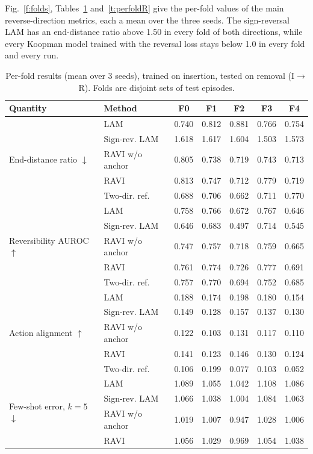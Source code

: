 \documentclass{jcse}
\newcommand{\method}{RAVI}
\begin{document}
Fig.~\ref{f:folds}, Tables~\ref{t:perfoldI} and~\ref{t:perfoldR} give the per-fold values of the main reverse-direction metrics, each a mean over the three seeds.
The sign-reversal LAM has an end-distance ratio above 1.50 in every fold of both directions, while every Koopman model trained with the reversal loss stays below 1.0 in every fold and every run.

\begin{table}
\centering
\caption{Per-fold results (mean over 3 seeds), trained on insertion, tested on removal (I$\to$R). Folds are disjoint sets of test episodes.}
\label{t:perfoldI}
\footnotesize
\setlength{\tabcolsep}{4pt}
\begin{tabular}{llccccc}
\toprule
Quantity & Method & F0 & F1 & F2 & F3 & F4 \\
\midrule
\multirow{5}{*}{End-distance ratio $\downarrow$} & LAM & 0.740 & 0.812 & 0.881 & 0.766 & 0.754 \\
 & Sign-rev. LAM & 1.618 & 1.617 & 1.604 & 1.503 & 1.573 \\
 & \method{} w/o anchor & 0.805 & 0.738 & 0.719 & 0.743 & 0.713 \\
 & \method & 0.813 & 0.747 & 0.712 & 0.779 & 0.719 \\
 & Two-dir. ref. & 0.688 & 0.706 & 0.662 & 0.711 & 0.770 \\
\midrule
\multirow{5}{*}{Reversibility AUROC $\uparrow$} & LAM & 0.758 & 0.766 & 0.672 & 0.767 & 0.646 \\
 & Sign-rev. LAM & 0.646 & 0.683 & 0.497 & 0.714 & 0.545 \\
 & \method{} w/o anchor & 0.747 & 0.757 & 0.718 & 0.759 & 0.665 \\
 & \method & 0.761 & 0.774 & 0.726 & 0.777 & 0.691 \\
 & Two-dir. ref. & 0.757 & 0.770 & 0.694 & 0.752 & 0.685 \\
\midrule
\multirow{5}{*}{Action alignment $\uparrow$} & LAM & 0.188 & 0.174 & 0.198 & 0.180 & 0.154 \\
 & Sign-rev. LAM & 0.149 & 0.128 & 0.157 & 0.137 & 0.130 \\
 & \method{} w/o anchor & 0.122 & 0.103 & 0.131 & 0.117 & 0.110 \\
 & \method & 0.141 & 0.123 & 0.146 & 0.130 & 0.124 \\
 & Two-dir. ref. & 0.106 & 0.199 & 0.077 & 0.103 & 0.052 \\
\midrule
\multirow{4}{*}{Few-shot error, $k=5$ $\downarrow$} & LAM & 1.089 & 1.055 & 1.042 & 1.108 & 1.086 \\
 & Sign-rev. LAM & 1.066 & 1.038 & 1.004 & 1.084 & 1.063 \\
 & \method{} w/o anchor & 1.019 & 1.007 & 0.947 & 1.028 & 1.006 \\
 & \method & 1.056 & 1.029 & 0.969 & 1.054 & 1.038 \\
\bottomrule
\end{tabular}
\end{table}
\end{document}
